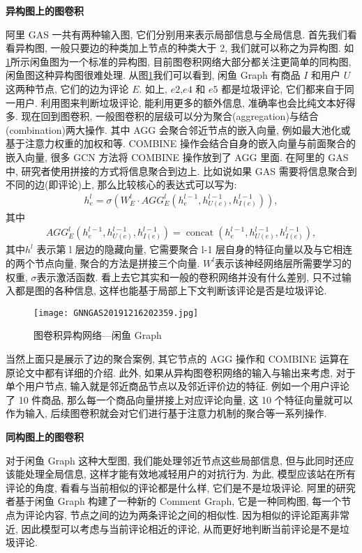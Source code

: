 \textbf{异构图上的图卷积}

阿里 GAS 一共有两种输入图, 它们分别用来表示局部信息与全局信息. 首先我们看看异构图, 一般只要边的种类加上节点的种类大于 2, 我们就可以称之为异构图. 如\ref{GNNGAS20191216202359}所示闲鱼图为一个标准的异构图, 目前图卷积网络大部分都关注更简单的同构图, 闲鱼图这种异构图很难处理.
从图\ref{GNNGAS20191216202359}我们可以看到, 闲鱼 Graph 有商品 $I$ 和用户 $U$ 这两种节点, 它们的边为评论 $E$. 如上, $e2$,$e4$ 和 $e5$ 都是垃圾评论, 它们都来自于同一用户. 利用图来判断垃圾评论, 能利用更多的额外信息, 准确率也会比纯文本好得多.
现在回到图卷积, 一般图卷积的层级可以分为聚合(aggregation)与结合(combination)两大操作. 其中 AGG 会聚合邻近节点的嵌入向量, 例如最大池化或基于注意力权重的加权和等. COMBINE 操作会结合自身的嵌入向量与前面聚合的嵌入向量, 很多 GCN 方法将 COMBINE 操作放到了 AGG 里面.  在阿里的 GAS 中, 研究者使用拼接的方式将信息聚合到边上. 比如说如果 GAS 需要将信息聚合到不同的边(即评论)上, 那么比较核心的表达式可以写为:
\begin{align}
  h_{e}^{l}=\sigma\left(W_{E}^{l} \cdot A G G_{E}^{l}\left(h_{e}^{l-1}, h_{U(e)}^{l-1}, h_{I(e)}^{l-1}\right)\right),
\end{align}
其中
\begin{align*}
  A G G_{E}^{l}\left(h_{e}^{l-1}, h_{U(e)}^{l-1}, h_{I(e)}^{l-1}\right)=\operatorname{concat}\left(h_{e}^{l-1}, h_{U(e)}^{l-1}, h_{I(e)}^{l-1}\right),
\end{align*}
其中$ h^l$ 表示第 l 层边的隐藏向量, 它需要聚合 l-1 层自身的特征向量以及与它相连的两个节点向量, 聚合的方法是拼接三个向量.
$W^l$表示该神经网络层所需要学习的权重, $\sigma$表示激活函数.
看上去它其实和一般的卷积网络并没有什么差别, 只不过输入都是图的各种信息, 这样也能基于局部上下文判断该评论是否是垃圾评论.
\begin{figure}[H]
\centering
\texttt{[image: GNNGAS20191216202359.jpg]}
\caption{图卷积异构网络---闲鱼 Graph}
\label{GNNGAS20191216202359}
\end{figure}
当然上面只是展示了边的聚合案例, 其它节点的 AGG 操作和 COMBINE 运算在原论文中都有详细的介绍.  此外, 如果从异构图卷积网络的输入与输出来考虑,
对于单个用户节点, 输入就是邻近商品节点以及邻近评价边的特征.
例如一个用户评论了 10 件商品, 那么每一个商品向量拼接上对应评论向量, 这 10 个特征向量就可以作为输入, 后续图卷积就会对它们进行基于注意力机制的聚合等一系列操作.

\textbf{同构图上的图卷积}

对于闲鱼 Graph 这种大型图, 我们能处理邻近节点这些局部信息, 但与此同时还应该能处理全局信息, 这样才能有效地减轻用户的对抗行为. 为此, 模型应该站在所有评论的角度, 看看与当前相似的评论都是什么样, 它们是不是垃圾评论.
阿里的研究者基于闲鱼 Graph 构建了一种新的 Comment Graph, 它是一种同构图, 每一个节点为评论内容, 节点之间的边为两条评论之间的相似性. 因为相似的评论距离非常近, 因此模型可以考虑与当前评论相近的评论, 从而更好地判断当前评论是不是垃圾评论.

